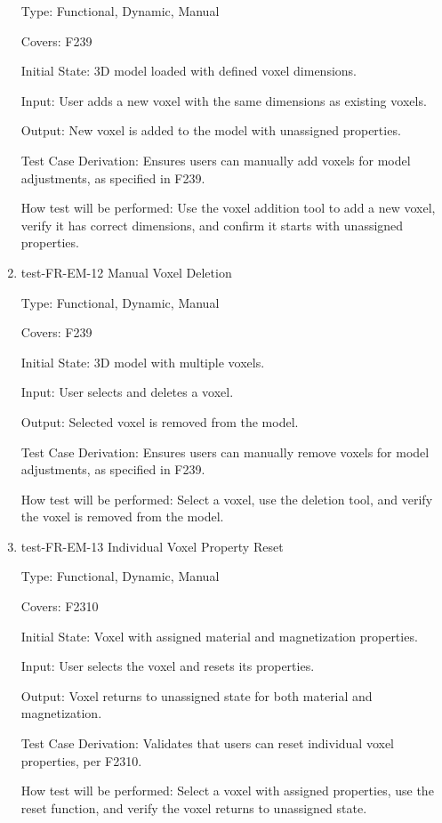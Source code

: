 \documentclass[12pt, titlepage]{article}
\begin{document}
\begin{enumerate}
Type: Functional, Dynamic, Manual

Covers: F239
					
Initial State: 3D model loaded with defined voxel dimensions.
					
Input: User adds a new voxel with the same dimensions as existing voxels.
					
Output: New voxel is added to the model with unassigned properties.

Test Case Derivation: Ensures users can manually add voxels for model adjustments, as specified in F239.
					
How test will be performed: Use the voxel addition tool to add a new voxel, verify it has correct dimensions, and confirm it starts with unassigned properties.

\item{test-FR-EM-12 Manual Voxel Deletion\\}

Type: Functional, Dynamic, Manual

Covers: F239
					
Initial State: 3D model with multiple voxels.
					
Input: User selects and deletes a voxel.
					
Output: Selected voxel is removed from the model.

Test Case Derivation: Ensures users can manually remove voxels for model adjustments, as specified in F239.
					
How test will be performed: Select a voxel, use the deletion tool, and verify the voxel is removed from the model.

\item{test-FR-EM-13 Individual Voxel Property Reset\\}

Type: Functional, Dynamic, Manual

Covers: F2310
					
Initial State: Voxel with assigned material and magnetization properties.
					
Input: User selects the voxel and resets its properties.
					
Output: Voxel returns to unassigned state for both material and magnetization.

Test Case Derivation: Validates that users can reset individual voxel properties, per F2310.
					
How test will be performed: Select a voxel with assigned properties, use the reset function, and verify the voxel returns to unassigned state.


\end{enumerate}
\end{document}
